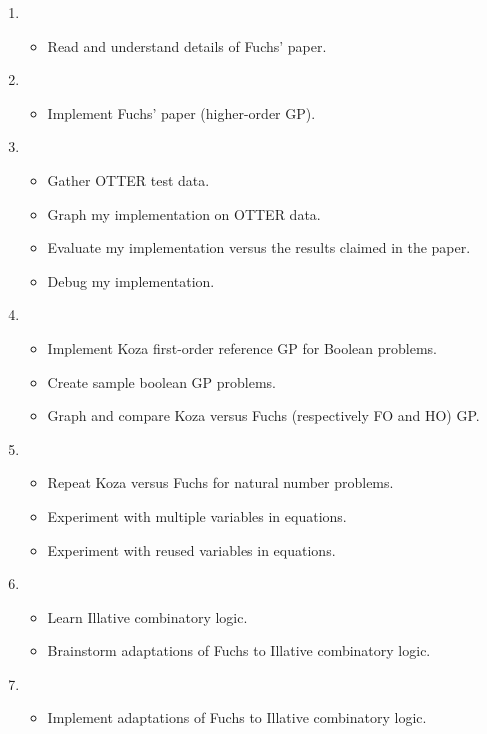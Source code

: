\documentclass{article}
\begin{document}
\begin{enumerate}

\item
\begin{itemize}
\item Read and understand details of Fuchs' paper.
\end{itemize}

\item
\begin{itemize}
\item Implement Fuchs' paper (higher-order GP).
\end{itemize}

\item
\begin{itemize}
\item Gather OTTER test data.
\item Graph my implementation on OTTER data.
\item Evaluate my implementation versus the results claimed in the paper.
\item Debug my implementation.
\end{itemize}

\item
\begin{itemize}
\item Implement Koza first-order reference GP for Boolean problems.
\item Create sample boolean GP problems.
\item Graph and compare Koza versus Fuchs (respectively FO and HO) GP.
\end{itemize}

\item
\begin{itemize}
\item Repeat Koza versus Fuchs for natural number problems.
\item Experiment with multiple variables in equations.
\item Experiment with reused variables in equations.
\end{itemize}

\item
\begin{itemize}
\item Learn Illative combinatory logic.
\item Brainstorm adaptations of Fuchs to Illative combinatory logic.
\end{itemize}

\item
\begin{itemize}
\item Implement adaptations of Fuchs to Illative combinatory logic.
\end{itemize}

\end{enumerate}
\end{document}
